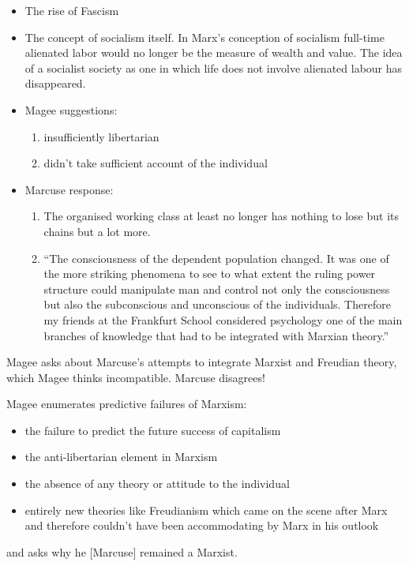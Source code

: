 \documentclass[10pt,titlepage]{book}
\begin{document}
\begin{itemize}
\item The rise of Fascism
\item The concept of socialism itself.
  In Marx's conception of socialism full-time alienated labor would no longer be the measure of wealth and value.
  The idea of a socialist society as one in which life does not involve alienated labour has disappeared.
\item Magee suggestions:
  \begin{enumerate}
  \item insufficiently libertarian
    \item didn't take sufficient account of the individual
    \end{enumerate}
\item Marcuse response:
  \begin{enumerate}
  \item The organised working class at least no longer has nothing to lose but its chains but a lot more.
    \item ``The consciousness of
      the dependent population changed.
It was one of the more striking phenomena to see to what extent the ruling power
structure could manipulate man and control not only the consciousness
but also the subconscious and unconscious of the individuals.
Therefore my friends at the Frankfurt School considered psychology one of the main
branches of knowledge that had to be integrated with Marxian theory.''
    \end{enumerate}
\end{itemize}

Magee asks about Marcuse's attempts to integrate Marxist and Freudian theory, which Magee thinks incompatible.
Marcuse disagrees!

Magee enumerates predictive failures of Marxism:

\begin{itemize}
\item the failure to
  predict the future success of capitalism
  \item
the anti-libertarian element in Marxism
\item the absence of any theory or attitude to
  the individual
  \item  entirely new theories like
Freudianism which came on the scene
after Marx and therefore couldn't have
been accommodating by Marx in his
outlook
\end{itemize}

and asks why he [Marcuse] remained a Marxist.
\end{document}
